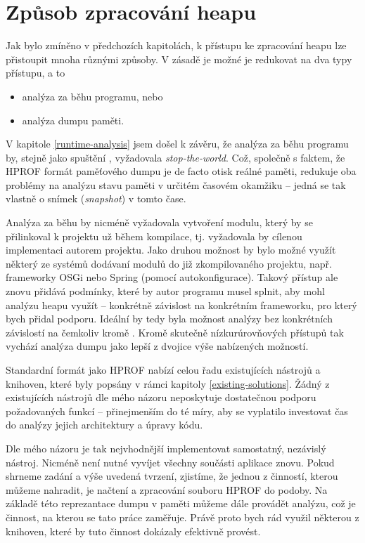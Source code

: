 \section{Způsob zpracování heapu}
Jak bylo zmíněno v předchozích kapitolách, k přístupu ke zpracování heapu lze přistoupit mnoha různými způsoby. V zásadě je možné je redukovat na dva typy přístupu, a to

\begin{itemize}
    \item analýza za běhu programu, nebo
    \item analýza dumpu paměti.
\end{itemize}

V kapitole \ref{runtime-analysis} jsem došel k závěru, že analýza za běhu programu by, stejně jako spuštění , vyžadovala \textit{stop-the-world}. Což, společně s faktem, že HPROF formát paměťového dumpu je de facto otisk reálné paměti, redukuje oba problémy na analýzu stavu paměti v určitém časovém okamžiku -- jedná se tak vlastně o snímek (\textit{snapshot}) v tomto čase. 

Analýza za běhu by nicméně vyžadovala vytvoření modulu, který by se přilinkoval k projektu už během kompilace, tj. vyžadovala by cílenou implementaci autorem projektu. Jako druhou možnost by bylo možné využít některý ze systémů dodávaní modulů do již zkompilovaného projektu, např. frameworky OSGi nebo Spring (pomocí autokonfigurace). Takový přístup ale znovu přidává podmínky, které by autor programu musel splnit, aby mohl analýzu heapu využít -- konkrétně závislost na konkrétním frameworku, pro který bych přidal podporu. Ideální by tedy byla možnost analýzy bez konkrétních závislostí na čemkoliv kromě . Kromě skutečně nízkurúrovňových přístupů tak vychází analýza dumpu jako lepší z dvojice výše nabízených možností. 

Standardní formát jako HPROF nabízí celou řadu existujících nástrojů a knihoven, které byly popsány v rámci kapitoly \ref{existing-solutions}. Žádný z existujících nástrojů dle mého názoru neposkytuje dostatečnou podporu požadovaných funkcí -- přinejmenším do té míry, aby se vyplatilo investovat čas do analýzy jejich architektury a úpravy kódu.

Dle mého názoru je tak nejvhodnější implementovat samostatný, nezávislý nástroj. Nicméně není nutné vyvíjet všechny součásti aplikace znovu. Pokud shrneme zadání a výše uvedená tvrzení, zjistíme, že jednou z činností, kterou můžeme nahradit, je načtení a zpracování souboru HPROF do  podoby. Na základě této reprezantace dumpu v paměti můžeme dále provádět analýzu, což je činnost, na kterou se tato práce zaměřuje. Právě proto bych rád využil některou z knihoven, které by tuto činnost dokázaly efektivně provést.

